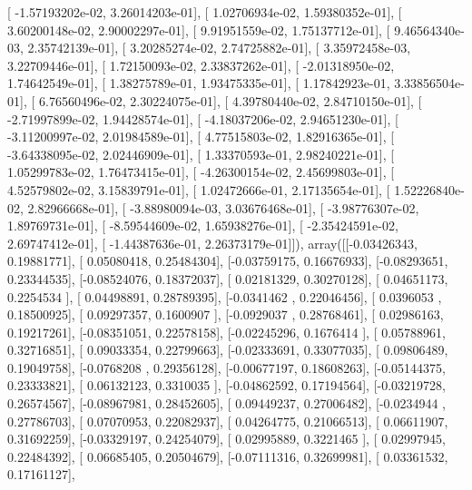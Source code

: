 \documentclass{article}
\begin{document}
       [ -1.57193202e-02,   3.26014203e-01],
       [  1.02706934e-02,   1.59380352e-01],
       [  3.60200148e-02,   2.90002297e-01],
       [  9.91951559e-02,   1.75137712e-01],
       [  9.46564340e-03,   2.35742139e-01],
       [  3.20285274e-02,   2.74725882e-01],
       [  3.35972458e-03,   3.22709446e-01],
       [  1.72150093e-02,   2.33837262e-01],
       [ -2.01318950e-02,   1.74642549e-01],
       [  1.38275789e-01,   1.93475335e-01],
       [  1.17842923e-01,   3.33856504e-01],
       [  6.76560496e-02,   2.30224075e-01],
       [  4.39780440e-02,   2.84710150e-01],
       [ -2.71997899e-02,   1.94428574e-01],
       [ -4.18037206e-02,   2.94651230e-01],
       [ -3.11200997e-02,   2.01984589e-01],
       [  4.77515803e-02,   1.82916365e-01],
       [ -3.64338095e-02,   2.02446909e-01],
       [  1.33370593e-01,   2.98240221e-01],
       [  1.05299783e-02,   1.76473415e-01],
       [ -4.26300154e-02,   2.45699803e-01],
       [  4.52579802e-02,   3.15839791e-01],
       [  1.02472666e-01,   2.17135654e-01],
       [  1.52226840e-02,   2.82966668e-01],
       [ -3.88980094e-03,   3.03676468e-01],
       [ -3.98776307e-02,   1.89769731e-01],
       [ -8.59544609e-02,   1.65938276e-01],
       [ -2.35424591e-02,   2.69747412e-01],
       [ -1.44387636e-01,   2.26373179e-01]]), array([[-0.03426343,  0.19881771],
       [ 0.05080418,  0.25484304],
       [-0.03759175,  0.16676933],
       [-0.08293651,  0.23344535],
       [-0.08524076,  0.18372037],
       [ 0.02181329,  0.30270128],
       [ 0.04651173,  0.2254534 ],
       [ 0.04498891,  0.28789395],
       [-0.0341462 ,  0.22046456],
       [ 0.0396053 ,  0.18500925],
       [ 0.09297357,  0.1600907 ],
       [-0.0929037 ,  0.28768461],
       [ 0.02986163,  0.19217261],
       [-0.08351051,  0.22578158],
       [-0.02245296,  0.1676414 ],
       [ 0.05788961,  0.32716851],
       [ 0.09033354,  0.22799663],
       [-0.02333691,  0.33077035],
       [ 0.09806489,  0.19049758],
       [-0.0768208 ,  0.29356128],
       [-0.00677197,  0.18608263],
       [-0.05144375,  0.23333821],
       [ 0.06132123,  0.3310035 ],
       [-0.04862592,  0.17194564],
       [-0.03219728,  0.26574567],
       [-0.08967981,  0.28452605],
       [ 0.09449237,  0.27006482],
       [-0.0234944 ,  0.27786703],
       [ 0.07070953,  0.22082937],
       [ 0.04264775,  0.21066513],
       [ 0.06611907,  0.31692259],
       [-0.03329197,  0.24254079],
       [ 0.02995889,  0.3221465 ],
       [ 0.02997945,  0.22484392],
       [ 0.06685405,  0.20504679],
       [-0.07111316,  0.32699981],
       [ 0.03361532,  0.17161127],
\end{document}
